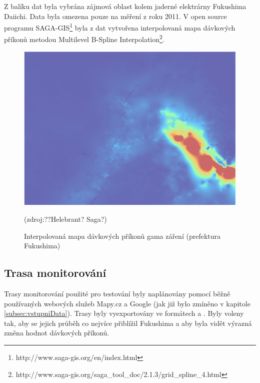 Z balíku dat byla vybrána zájmová oblast kolem jaderné elektrárny Fukushima Daiichi. Data byla omezena pouze na měření z roku 2011. V open source programu SAGA-GIS\footnote{http://www.saga-gis.org/en/index.html} byla z dat vytvořena interpolovaná mapa dávkových příkonů metodou Multilevel B-Spline Interpolation\footnote{http://www.saga-gis.org/saga\_tool\_doc/2.1.3/grid\_spline\_4.html}.

\begin{figure}[H]
    \centering
    \includegraphics[scale=0.4]{./pictures/interpolovana_mapa.png}
      	\caption[Interpolovaná mapa dávkových příkonů (prefektura Fukushima)]{Interpolovaná mapa dávkových příkonů gama záření (prefektura Fukushima)}(zdroj:??Helebrant? Saga?)
    	\label{fig:interpolatedMap}
\end{figure} 

\subsection{Trasa monitorování}
Trasy monitorování použité pro testování byly naplánovány pomocí běžně používaných webových služeb Mapy.cz a Google (jak již bylo zmíněno v kapitole \ref{subsec:vstupniData}). Trasy byly vyexportovány ve formátech  a . Byly voleny tak, aby se jejich průběh co nejvíce přiblížil  Fukushima a aby byla vidět výrazná změna hodnot dávkových příkonů.

